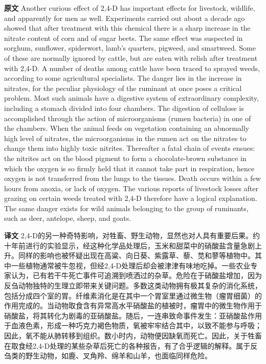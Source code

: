 \documentclass[UTF8,zihao=-4]{ctexart}
\begin{document}
\noindent\textbf{原文} Another curious effect of 2,4-D has important effects for livestock, wildlife, and apparently for men as well. Experiments carried out about a decade ago showed that after treatment with this chemical there is a sharp increase in the nitrate content of corn and of sugar beets. The same effect was suspected in sorghum, sunflower, spiderwort, lamb's quarters, pigweed, and smartweed. Some of these are normally ignored by cattle, but are eaten with relish after treatment with 2,4-D. A number of deaths among cattle have been traced to sprayed weeds, according to some agricultural specialists. The danger lies in the increase in nitrates, for the peculiar physiology of the ruminant at once poses a critical problem. Most such animals have a digestive system of extraordinary complexity, including a stomach divided into four chambers. The digestion of cellulose is accomplished through the action of microorganisms (rumen bacteria) in one of the chambers. When the animal feeds on vegetation containing an abnormally high level of nitrates, the microorganisms in the rumen act on the nitrates to change them into highly toxic nitrites. Thereafter a fatal chain of events ensues: the nitrites act on the blood pigment to form a chocolate-brown substance in which the oxygen is so firmly held that it cannot take part in respiration, hence oxygen is not transferred from the lungs to the tissues. Death occurs within a few hours from anoxia, or lack of oxygen. The various reports of livestock losses after grazing on certain weeds treated with 2,4-D therefore have a logical explanation. The same danger exists for wild animals belonging to the group of ruminants, such as deer, antelope, sheep, and goats.
\par
\noindent\textbf{译文} 2,4-D的另一种奇特影响，对牲畜、野生动物，显然也对人具有重要后果。约十年前进行的实验显示，经这种化学品处理后，玉米和甜菜中的硝酸盐含量急剧上升。同样的影响也被怀疑出现在高粱、向日葵、紫露草、藜、苋和蓼等植物中。其中一些植物通常被牛忽视，但经2,4-D处理后却会被津津有味地吃掉。一些农业专家认为，已有若干牛死亡事件可追溯到喷洒过的杂草。危险在于硝酸盐增加，因为反刍动物独特的生理立即带来关键问题。多数这类动物拥有极其复杂的消化系统，包括分成四个室的胃。纤维素消化是在其中一个胃室里通过微生物（瘤胃细菌）的作用完成的。当动物取食含有异常高水平硝酸盐的植被时，瘤胃中的微生物作用于硝酸盐，将其转化为剧毒的亚硝酸盐。随后，一连串致命事件发生：亚硝酸盐作用于血液色素，形成一种巧克力褐色物质，氧被牢牢结合其中，以致不能参与呼吸；因此，氧不能从肺转移到组织。数小时内，动物便因缺氧而死亡。因此，关于牲畜在取食经2,4-D处理的某些杂草后死亡的各种报告，有了合乎逻辑的解释。属于反刍类的野生动物，如鹿、叉角羚、绵羊和山羊，也面临同样危险。
\par\medskip
\end{document}
